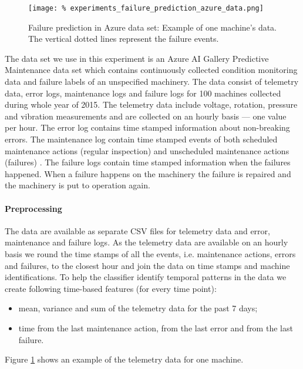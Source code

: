 \begin{figure}
	\centering
    \texttt{[image: \%
        experiments\_failure\_prediction\_azure\_data.png]}
	\caption{Failure prediction in Azure data set: Example of one machine's data. The vertical dotted lines represent the failure events.}
	\label{fig:experiments_failure_prediction_azure_data}
\end{figure}

The data set we use in this experiment is an Azure AI Gallery Predictive Maintenance data set \cite{data_set_azure_ai_gallery} which contains continuously collected condition monitoring data and failure labels of an unspecified machinery.
The data consist of telemetry data, error logs, maintenance logs and failure logs for 100 machines collected during whole year of 2015.
The telemetry data include voltage, rotation, pressure and vibration measurements and are collected on an hourly basis --- one value per hour.
The error log contains time stamped information about non-breaking errors.
The maintenance log contain time stamped events of both scheduled maintenance actions (regular inspection) and unscheduled maintenance actions (failures) .
The failure logs contain time stamped information when the failures happened.
When a failure happens on the machinery the failure is repaired and the machinery is put to operation again.

\paragraph{Preprocessing}

The data are available as separate CSV files for telemetry data and error, maintenance and failure logs.
As the telemetry data are available on an hourly basis we round the time stamps of all the events, i.e. maintenance actions, errors and failures, to the closest hour and join the data on time stamps and machine identifications.
To help the classifier identify temporal patterns in the data we create following time-based features (for every time point): 
\begin{itemize}
    \item mean, variance and sum of the telemetry data for the past 7 days;
    \item time from the last maintenance action, from the last error and from the last failure.
\end{itemize}
Figure \ref{fig:experiments_failure_prediction_azure_data} shows an example of the telemetry data for one machine.

